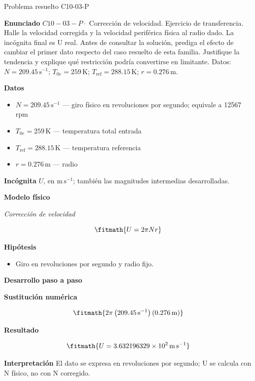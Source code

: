 \documentclass[10pt,openany]{book}
\begin{document}
\begin{studiumworked}{Problema resuelto C10-03-P}


\noindent\textbf{Enunciado}
\(C10-03-P \cdot\) Corrección de velocidad. Ejercicio de transferencia. Halle la velocidad corregida y la velocidad periférica física al radio dado. La incógnita final es U real. Antes de consultar la solución, prediga el efecto de cambiar el primer dato respecto del caso resuelto de esta familia. Justifique la tendencia y explique qué restricción podría convertirse en limitante. Datos: \(N=209.45\, \mathrm{s}^{-1}\); \(T_{0e}=259\, \mathrm{K}\); \(T_{\mathrm{ref}}=288.15\, \mathrm{K}\); \(r=0.276\, \mathrm{m}\).

\noindent\textbf{Datos}
\begin{itemize}
\item $N = 209.45\,\mathrm{s}^{-1}$ — giro físico en revoluciones por segundo; equivale a 12567 rpm
\item $T_{0e} = 259\,\mathrm{K}$ — temperatura total entrada
\item $T_{\mathrm{ref}} = 288.15\,\mathrm{K}$ — temperatura referencia
\item $r = 0.276\,\mathrm{m}$ — radio
\end{itemize}

\noindent\textbf{Incógnita}
$U$, en $\mathrm{m\,s^{-1}}$; también las magnitudes intermedias desarrolladas.

\noindent\textbf{Modelo físico}

\noindent\textit{Corrección de velocidad}

\[
\fitmath{U=2 \pi N r}
\]

\noindent\textbf{Hipótesis}
\begin{itemize}
\item Giro en revoluciones por segundo y radio fijo.
\end{itemize}

\noindent\textbf{Desarrollo paso a paso}



\noindent\textbf{Sustitución numérica}

\[
\fitmath{2 \pi \left(209.45\,\mathrm{s}^{-1}\right) \left(0.276\,\mathrm{m}\right)}
\]

\noindent\textbf{Resultado}

\[
\fitmath{U=3.632196329\times10^{2}\,\mathrm{m}\,\mathrm{s}^{-1}}
\]

\noindent\textbf{Interpretación}
El dato se expresa en revoluciones por segundo; U se calcula con N físico, no con N corregido.


\end{studiumworked}
\end{document}
